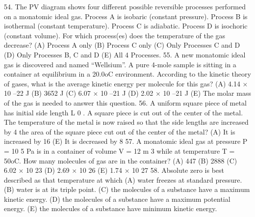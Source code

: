 54. The PV diagram shows four different possible reversible processes performed on a monatomic ideal gas.
Process A is isobaric (constant pressure). Process B is isothermal (constant temperature). Process C is
adiabatic. Process D is isochoric (constant volume). For which process(es) does the temperature of the gas
decrease?
(A) Process A only (B) Process C only (C) Only Processes C and D (D) Only Processes B, C and D
(E) All 4 Processes.
55. A new monatomic ideal gas is discovered and named “Wellsium”. A pure 4-mole sample is sitting in a
container at equilibrium in a 20.0oC environment. According to the kinetic theory of gases, what is the average
kinetic energy per molecule for this gas?
(A) 4.14 × 10 –22 J (B) 3652 J (C) 6.07 × 10 –21 J (D) 2.02 × 10 –21 J
(E) The molar mass of the gas is needed to answer this question.
56. A uniform square piece of metal has initial side length L 0 . A square piece is cut out of the center of the metal.
The temperature of the metal is now raised so that the side lengths are increased by 4%
the area of the square piece cut out of the center of the metal?
(A) It is increased by 16 %
(E) It is decreased by 8 %
57. A monatomic ideal gas at pressure P = 10 5 Pa is in a container of volume V = 12 m 3 while at temperature T =
50oC. How many molecules of gas are in the container?
(A) 447 (B) 2888 (C) 6.02 × 10 23 (D) 2.69 × 10 26 (E) 1.74 × 10 27
58. Absolute zero is best described as that temperature at which
(A) water freezes at standard pressure.
(B) water is at its triple point.
(C) the molecules of a substance have a maximum kinetic energy.
(D) the molecules of a substance have a maximum potential energy.
(E) the molecules of a substance have minimum kinetic energy.



